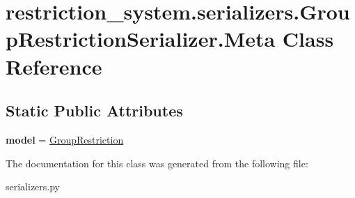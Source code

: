 \hypertarget{classrestriction__system_1_1serializers_1_1GroupRestrictionSerializer_1_1Meta}{}\section{restriction\+\_\+system.\+serializers.\+Group\+Restriction\+Serializer.\+Meta Class Reference}
\label{classrestriction__system_1_1serializers_1_1GroupRestrictionSerializer_1_1Meta}
\subsection*{Static Public Attributes}
\begin{DoxyCompactItemize}
\item 
\hypertarget{classrestriction__system_1_1serializers_1_1GroupRestrictionSerializer_1_1Meta_af6e813cabdea1332f4c218a864b0dce4}{}{\bfseries model} = \hyperlink{classrestriction__system_1_1models_1_1GroupRestriction}{Group\+Restriction}\label{classrestriction__system_1_1serializers_1_1GroupRestrictionSerializer_1_1Meta_af6e813cabdea1332f4c218a864b0dce4}

\end{DoxyCompactItemize}


The documentation for this class was generated from the following file\+:\begin{DoxyCompactItemize}
\item 
serializers.\+py\end{DoxyCompactItemize}
